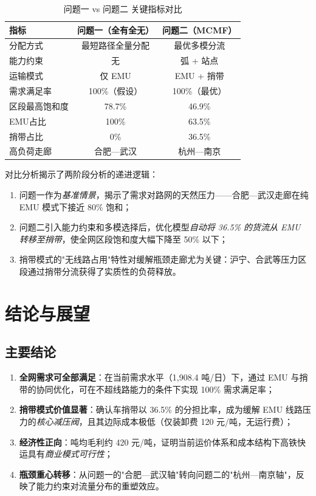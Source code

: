 \documentclass[12pt,a4paper,fontset=none]{ctexart}
\begin{document}
\begin{table}[H]
\centering
\caption{问题一 vs 问题二 关键指标对比}
\begin{tabular}{lcc}
\toprule
\textbf{指标} & \textbf{问题一（全有全无）} & \textbf{问题二（MCMF）} \\
\midrule
分配方式 & 最短路径全量分配 & 最优多模分流 \\
能力约束 & 无 & 弧 + 站点 \\
运输模式 & 仅 EMU & EMU + 捎带 \\
需求满足率 & 100\%（假设） & 100\%（最优） \\
区段最高饱和度 & 78.7\% & 46.9\% \\
EMU占比 & 100\% & 63.5\% \\
捎带占比 & 0\% & 36.5\% \\
高负荷走廊 & 合肥—武汉 & 杭州—南京 \\
\bottomrule
\end{tabular}
\end{table}

对比分析揭示了两阶段分析的递进逻辑：

\begin{enumerate}[leftmargin=*]
    \item 问题一作为\emph{基准情景}，揭示了需求对路网的天然压力——合肥—武汉走廊在纯 EMU 模式下接近 80\% 饱和；
    \item 问题二引入能力约束和多模选择后，优化模型\emph{自动将 36.5\% 的货流从 EMU 转移至捎带}，使全网区段饱和度大幅下降至 50\% 以下；
    \item 捎带模式的"无线路占用"特性对缓解瓶颈走廊尤为关键：沪宁、合武等压力区段通过捎带分流获得了实质性的负荷释放。
\end{enumerate}

\section{结论与展望}

\subsection{主要结论}

\begin{enumerate}[leftmargin=*]
    \item \textbf{全网需求可全部满足}：在当前需求水平（1,908.4 吨/日）下，通过 EMU 与捎带的协同优化，可在不超线路能力的条件下实现 100\% 需求满足率；
    \item \textbf{捎带模式价值显著}：确认车捎带以 36.5\% 的分担比率，成为缓解 EMU 线路压力的\emph{核心减压阀}，且其边际成本极低（仅装卸费 120 元/吨，无运行费）；
    \item \textbf{经济性正向}：吨均毛利约 420 元/吨，证明当前运价体系和成本结构下高铁快运具有\emph{商业模式可行性}；
    \item \textbf{瓶颈重心转移}：从问题一的"合肥—武汉轴"转向问题二的"杭州—南京轴"，反映了能力约束对流量分布的重塑效应。
\end{enumerate}
\end{document}

